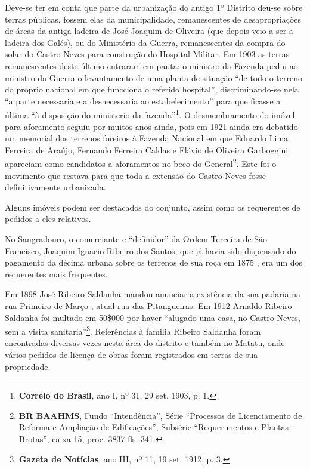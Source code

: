 
Deve-se ter em conta que parte da urbanização do antigo 1º Distrito deu-se sobre terras públicas, fossem elas da municipalidade, remanescentes de desapropriações de áreas da antiga ladeira de José Joaquim de Oliveira (que depois veio a ser a ladeira dos Galés), ou do Ministério da Guerra, remanescentes da compra do solar do Castro Neves para construção do Hospital Militar. Em 1903 as terras remanescentes deste último entraram em pauta: o ministro da Fazenda pediu ao ministro da Guerra o levantamento de uma planta de situação ``de todo o terreno do proprio nacional em que funcciona o referido hospital'', discriminando-se nela ``a parte necessaria e a desnecessaria ao estabelecimento'' para que ficasse a última ``à disposição do ministerio da fazenda''\footnote{\textbf{Correio do Brasil}, ano I, nº 31, 29 set. 1903, p. 1.}. O desmembramento do imóvel para aforamento seguiu por muitos anos ainda, pois em 1921 ainda era debatido um memorial dos terrenos foreiros à Fazenda Nacional em que Eduardo Lima Ferreira de Araújo, Fernando Ferreira Caldas e Flávio de Oliveira Garboggini apareciam como candidatos a aforamentos no beco do General\footnote{\textbf{BR BAAHMS}, Fundo ``Intendência'', Série ``Processos de Licenciamento de Reforma e Ampliação de Edificações'', Subsérie ``Requerimentos e Plantas -- Brotas'', caixa 15, proc. 3837 fls. 341.}. Este foi o movimento que restava para que toda a extensão do Castro Neves fosse definitivamente urbanizada.

Alguns imóveis podem ser destacados do conjunto, assim como os requerentes de
pedidos a eles relativos.


No Sangradouro, o comerciante e ``definidor'' da Ordem Terceira de São Francisco, Joaquim Ignacio Ribeiro dos Santos, que já havia sido dispensado do pagamento da décima urbana sobre os terrenos de sua roça em 1875 \cite[p.~226]{bahia_assembleia_1875}, era um dos requerentes mais frequentes.

Em 1898 José Ribeiro Saldanha mandou anunciar a existência da sua padaria na rua Primeiro de Março \cite[p.~436]{reis_almanak_1898}, atual rua das Pitangueiras. Em 1912 Arnaldo Ribeiro Saldanha foi multado em 50\$000 por haver ``alugado uma casa, no Castro Neves, sem a visita sanitaria''\footnote{\textbf{Gazeta de Notícias}, ano III, nº 11, 19 set. 1912, p. 3.}. Referências à familia Ribeiro Saldanha foram encontradas diversas vezes nesta área do distrito e também no Matatu, onde vários pedidos de licença de obras foram registrados em terras de sua propriedade. 

